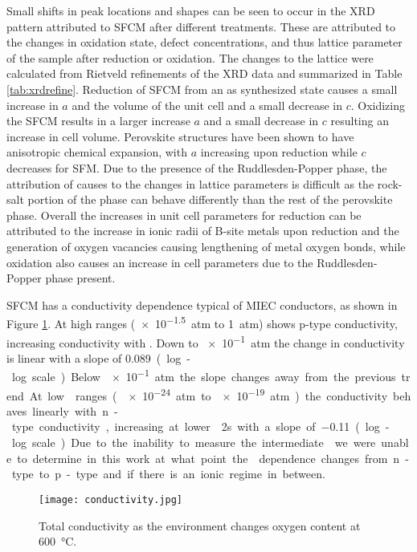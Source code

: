     Small shifts in peak locations and shapes can be seen to occur in the XRD pattern attributed to SFCM after different treatments.
    These are attributed to the changes in oxidation state, defect concentrations, and thus lattice parameter of the sample after reduction or oxidation.
    The changes to the lattice were calculated from Rietveld refinements of the XRD data and summarized in Table \ref{tab:xrdrefine}.
    Reduction of SFCM from an as synthesized state causes a small increase in $a$ and the volume of the unit cell and a small decrease in $c$.
    Oxidizing the SFCM results in a larger increase $a$ and a small decrease in $c$ resulting an increase in cell volume.
    Perovskite structures have been shown to have anisotropic chemical expansion, with $a$ increasing upon reduction while $c$ decreases for SFM.\cite{Tsvetkov2016}
    Due to the presence of the Ruddlesden-Popper phase, the attribution of causes to the changes in lattice parameters is difficult as the rock-salt portion of the phase can behave differently than the rest of the perovskite phase.\cite{Bishop2014}
    Overall the increases in unit cell parameters for reduction can be attributed to the increase in ionic radii of B-site metals upon reduction and the generation of oxygen vacancies causing lengthening of metal oxygen bonds, while oxidation also causes an increase in cell parameters due to the Ruddlesden-Popper phase present.

    SFCM has a conductivity dependence typical of MIEC conductors, as shown in Figure \ref{fig:conductivity}.
    At high  ranges (\SI{e-1.5}{atm} to \SI{1}{atm}) shows p-type conductivity, increasing conductivity with .
    Down to \SI{e-1}{atm} the change in conductivity is linear with a slope of \SI{0.089} (log-log scale).
    Below \SI{e-1}{atm} the slope changes away from the previous trend.
    At low  ranges (\SI{e-24}{atm} to \SI{e-19}{atm}) the conductivity behaves linearly with n-type conductivity, increasing at lower \po2s with a slope of \SI{-0.11} (log-log scale).
    Due to the inability to measure the intermediate  we were unable to determine in this work at what point the  dependence changes from n-type to p-type and if there is an ionic regime in between.

    \begin{figure}
      \texttt{[image: conductivity.jpg]}
      \caption{Total conductivity as the environment changes oxygen content at \SI{600}{\celsius}.}
      \label{fig:conductivity}
    \end{figure}

